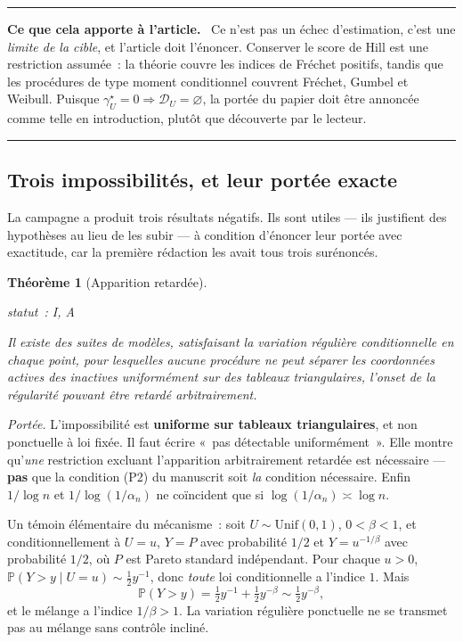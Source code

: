 \documentclass[11pt]{article}
\theoremstyle{plain}
\newtheorem{theoreme}{Théorème}[section]
\theoremstyle{definition}
\theoremstyle{remark}
\newcommand{\Pp}{\mathbb P}
\newcommand{\1}{\mathbf 1}
\newcommand{\D}{\mathcal D_U}
\newcommand{\gU}{\gamma^\star_U}
\newcommand{\statut}[1]{%
  \nopagebreak\par\nopagebreak
  \hfill{\normalfont\footnotesize\textcolor{gris}{statut~: #1}}%
  \par\nopagebreak\vspace{-2pt}}
\newenvironment{apport}
  {\par\medskip\noindent\begingroup\color{bleu}\rule{\linewidth}{0.6pt}\par
   \nobreak\vspace{2pt}\noindent\textbf{Ce que cela apporte à l'article.}\ \normalcolor}
  {\par\vspace{2pt}\noindent\textcolor{bleu}{\rule{\linewidth}{0.6pt}}\endgroup\par\medskip}
\begin{document}
\begin{apport}
Ce n'est pas un échec d'estimation, c'est une \emph{limite de la cible},
et l'article doit l'énoncer. Conserver le score de Hill est une
restriction assumée~: la théorie couvre les indices de Fréchet positifs,
tandis que les procédures de type moment conditionnel couvrent Fréchet,
Gumbel et Weibull. Puisque $\gU=0\Rightarrow\D=\varnothing$, la portée du
papier doit être annoncée comme telle en introduction, plutôt que
découverte par le lecteur.
\end{apport}

\subsection{Trois impossibilités, et leur portée exacte}

La campagne a produit trois résultats négatifs. Ils sont utiles --- ils
justifient des hypothèses au lieu de les subir --- à condition d'énoncer
leur portée avec exactitude, car la première rédaction les avait tous
trois surénoncés.

\begin{theoreme}[Apparition retardée]
\label{thm:retard}
\statut{I, A}
Il existe des suites de modèles, satisfaisant la variation régulière
conditionnelle en chaque point, pour lesquelles aucune procédure ne peut
séparer les coordonnées actives des inactives uniformément sur des
tableaux triangulaires, l'onset de la régularité pouvant être retardé
arbitrairement.
\end{theoreme}

\noindent
\emph{Portée.} L'impossibilité est \textbf{uniforme sur tableaux
triangulaires}, et non ponctuelle à loi fixée. Il faut écrire «~pas
détectable uniformément~». Elle montre qu'\emph{une} restriction excluant
l'apparition arbitrairement retardée est nécessaire --- \textbf{pas} que
la condition (P2) du manuscrit soit \emph{la} condition nécessaire. Enfin
$1/\log n$ et $1/\log(1/\alpha_n)$ ne coïncident que si
$\log(1/\alpha_n)\asymp\log n$.

Un témoin élémentaire du mécanisme~: soit $U\sim\mathrm{Unif}(0,1)$,
$0<\beta<1$, et conditionnellement à $U=u$,
$Y=P$ avec probabilité $1/2$ et $Y=u^{-1/\beta}$ avec probabilité $1/2$,
où $P$ est Pareto standard indépendant. Pour chaque $u>0$,
$\Pp(Y>y\mid U=u)\sim\tfrac12y^{-1}$, donc \emph{toute} loi
conditionnelle a l'indice $1$. Mais
\[
 \Pp(Y>y)=\tfrac12y^{-1}+\tfrac12 y^{-\beta}\sim\tfrac12y^{-\beta},
\]
et le mélange a l'indice $1/\beta>1$. La variation régulière ponctuelle
ne se transmet pas au mélange sans contrôle incliné.
\end{document}
